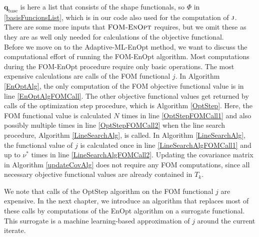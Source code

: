 $\mathbf{q}_\mathrm{base}$ is here a list that consists of the shape functionals, so $\Phi$ in \eqref{basisFuncionsList}, which is in our code also used for the computation of $\textproc{j}$. There are some more inputs that $\textproc{FOM-EnOpt}$ requires, but we omit these as they are as well only needed for calculations of the objective functional.\\

Before we move on to the Adaptive-ML-EnOpt method, we want to discuss the computational effort of running the FOM-EnOpt algorithm. Most computations during the FOM-EnOpt procedure require only basic operations. The most expensive calculations are calls of the FOM functional $j$. In Algorithm \ref{EnOptAlg}, the only computation of the FOM objective functional value is in line \ref{EnOptAlgFOMCall}. The other objective functional values get returned by calls of the optimization step procedure, which is Algorithm \ref{OptStep}. Here, the FOM functional value is calculated $N$ times in line \ref{OptStepFOMCall1} and also possibly multiple times in line \ref{OptStepFOMCall2} when the line search procedure, Algorithm \ref{LineSearchAlg}, is called. In Algorithm \ref{LineSearchAlg}, the functional value of $j$ is calculated once in line \ref{LineSearchAlgFOMCall1} and up to $\nu^*$ times in line \ref{LineSearchAlgFOMCall2}. Updating the covariance matrix in Algorithm \ref{updateCovAlg} does not require any FOM computations, since all necessary objective functional values are already contained in $T_k$.

We note that calls of the OptStep algorithm on the FOM functional $j$ are expensive. In the next chapter, we introduce an algorithm that replaces most of these calls by computations of the EnOpt algorithm on a surrogate functional. This surrogate is a machine learning-based approximation of $j$ around the current iterate.